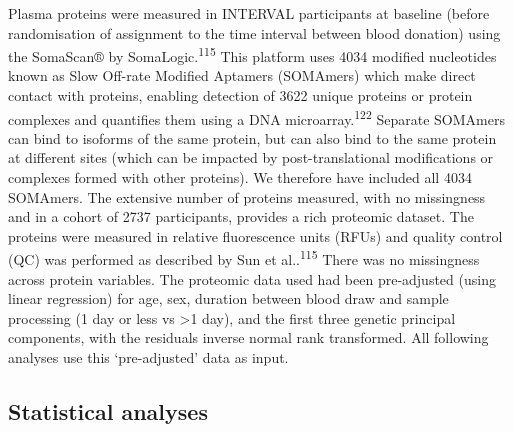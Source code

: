 \documentclass[11pt,twoside]{bristolthesis}
\begin{document}
Plasma proteins were measured in INTERVAL participants at baseline (before randomisation of assignment to the time interval between blood donation) using the SomaScan® by SomaLogic.\textsuperscript{115} This platform uses 4034 modified nucleotides known as Slow Off-rate Modified Aptamers (SOMAmers) which make direct contact with proteins, enabling detection of 3622 unique proteins or protein complexes and quantifies them using a DNA microarray.\textsuperscript{122} Separate SOMAmers can bind to isoforms of the same protein, but can also bind to the same protein at different sites (which can be impacted by post-translational modifications or complexes formed with other proteins). We therefore have included all 4034 SOMAmers. The extensive number of proteins measured, with no missingness and in a cohort of 2737 participants, provides a rich proteomic dataset. The proteins were measured in relative fluorescence units (RFUs) and quality control (QC) was performed as described by Sun et al..\textsuperscript{115} There was no missingness across protein variables. The proteomic data used had been pre-adjusted (using linear regression) for age, sex, duration between blood draw and sample processing (1 day or less vs \textgreater1 day), and the first three genetic principal components, with the residuals inverse normal rank transformed. All following analyses use this `pre-adjusted' data as input.

\hypertarget{statistical-analyses}{%
\subsection{Statistical analyses}\label{statistical-analyses}}
\end{document}
